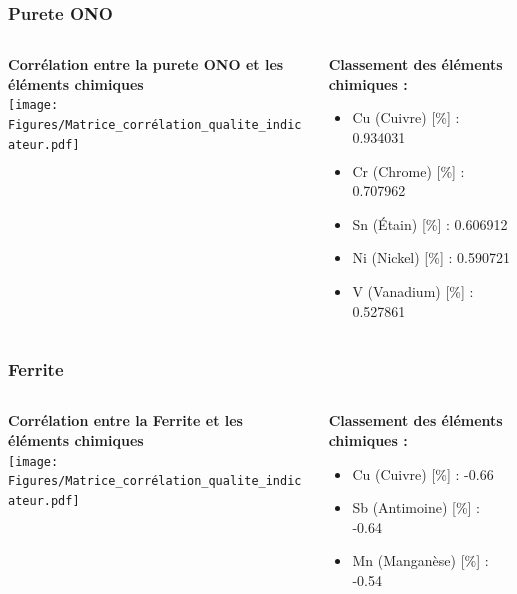 \documentclass[aspectratio=169]{beamer}
\begin{document}
\begin{frame}
\frametitle{Purete ONO}
\begin{columns}[t]
  \begin{column}{0.5\textwidth}
    \centering
    \textbf{Corrélation entre la purete ONO et les éléments chimiques} \\
    \texttt{[image: Figures/Matrice\_corrélation\_qualite\_indicateur.pdf]} 
  \end{column}
  \begin{column}{0.5\textwidth}
    \textbf{Classement des éléments chimiques : }
    \begin{itemize}
      \item Cu (Cuivre) [\%] : 0.934031
      \item Cr (Chrome) [\%] : 0.707962
      \item Sn (Étain) [\%] : 0.606912
      \item Ni (Nickel) [\%] : 0.590721
      \item V (Vanadium) [\%] : 0.527861
    \end{itemize}
  \end{column}
\end{columns}
\end{frame}


\begin{frame}
\frametitle{Ferrite}
\begin{columns}[t]
  \begin{column}{0.5\textwidth}
    \centering
    \textbf{Corrélation entre la Ferrite et les éléments chimiques} \\
    \texttt{[image: Figures/Matrice\_corrélation\_qualite\_indicateur.pdf]} 
  \end{column}
  \begin{column}{0.5\textwidth}
  \textbf{Classement des éléments chimiques : }
    \begin{itemize}
      \item Cu (Cuivre) [\%] : -0.66
      \item Sb (Antimoine) [\%] : -0.64
      \item Mn (Manganèse) [\%] : -0.54
    \end{itemize}
  \end{column}
\end{columns}
\end{frame}
\end{document}
